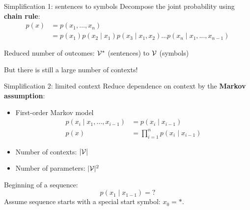 \documentclass[usenames,dvipsnames,notes]{beamer}
\begin{document}
\begin{frame}
    {Simplification 1: sentences to symbols}
    Decompose the joint probability using \textbf{chain rule}:
            \begin{align*}
            p(x) &= p(x_1, \ldots, x_n) \\
                &= p(x_1)p(x_2\mid x_1)p(x_3\mid x_1, x_2)\ldots p(x_n\mid x_{1}, \ldots, x_{n-1})
            \end{align*}

    \vspace{4em}
    Reduced number of outcomes: $\mathcal{V}^*$ (sentences) to $\mathcal{V}$ (symbols)

    But there is still a large number of contexts!
\end{frame}

\begin{frame}
    {Simplification 2: limited context}
    Reduce dependence on context by the \textbf{Markov assumption}:\\
    \begin{itemize}
        \item First-order Markov model
            \begin{align*}
                p(x_i\mid x_1,\ldots, x_{i-1}) &= p(x_i\mid x_{i-1}) \\
                p(x) &= \prod_{i=1}^n p(x_i\mid x_{i-1})
            \end{align*}
        \item Number of contexts: $|\mathcal{V}|$
        \item Number of parameters: $|\mathcal{V}|^2$
    \end{itemize}

    Beginning of a sequence:\\
    $$
    p(x_1\mid x_{1-1}) = ?
    $$
    Assume sequence starts with a special start symbol: $x_0=*$.
\end{frame}
\end{document}
